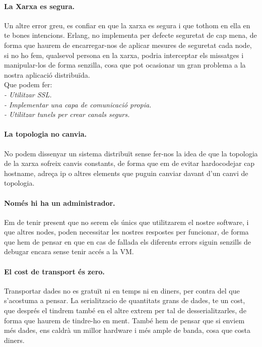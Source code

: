 \documentclass[a4paper, 10pt]{article}
\begin{document}
\newpage\paragraph{La Xarxa es segura.\\}
\hspace{-0,40cm}Un altre error greu, es confiar en que la xarxa es segura i que tothom en ella en te bones intencions. Erlang, no implementa per defecte seguretat de cap mena, de forma que haurem de encarregar-nos de aplicar mesures de seguretat cada node, si no ho fem, qualsevol persona en la xarxa, podria interceptar els missatges i manipular-los de forma senzilla, cosa que pot ocasionar un gran problema a la nostra aplicació distribuïda.\\
Que podem fer:\\
\textit{- Utilitzar SSL.\\}
\textit{- Implementar una capa de comunicació propia.\\}
\textit{- Utilitzar tunels per crear canals segurs.}

\paragraph{La topologia no canvia.\\}
\hspace{-0,5cm}
No podem dissenyar un sistema distribuït sense fer-nos la idea de que la topologia de la xarxa sofreix canvis constants, de forma que em de evitar hardocodejar cap hostname, adreça ip o altres elements que puguin canviar davant d'un canvi de topologia.


\paragraph{Només hi ha un administrador.\\}
\hspace{-0,350cm}Em de tenir present que no serem els únics que utilitzarem el nostre software, i que altres nodes, poden necessitar les nostres respostes per funcionar, de forma que hem de pensar en que en cas de fallada els diferents errors siguin senzills de debugar encara sense tenir accés a la VM.

\paragraph{El cost de transport és zero.\\}
\hspace{-0,40cm}Transportar dades no es gratuït ni en temps ni en diners, per contra del que s’acostuma a pensar. La serialitzacio de quantitats grans de dades, te un cost, que després el tindrem també en el altre extrem per tal de desserialitzarles, de forma que haurem de tindre-ho en ment. També hem de pensar que si enviem més dades, ens caldrà un millor hardware i més ample de banda, cosa que costa diners.
\end{document}

